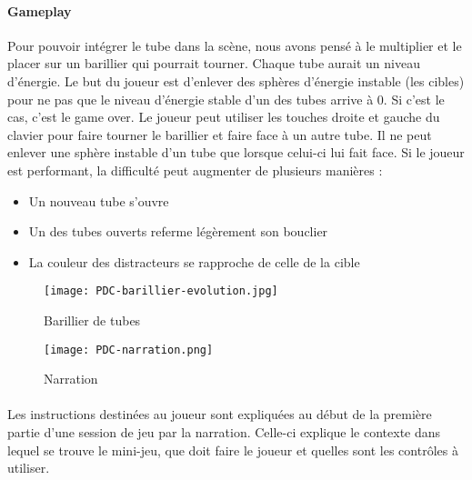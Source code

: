 \newpage

\paragraph{Gameplay}Pour pouvoir intégrer le tube dans la scène, nous avons pensé à le multiplier et le placer sur un barillier qui pourrait tourner. Chaque tube aurait un niveau
d'énergie. Le but du joueur est d'enlever des sphères d'énergie instable (les cibles) pour ne pas que le niveau d'énergie stable d'un des tubes arrive à 0. Si c'est le cas, c'est le
game over. Le joueur peut utiliser les touches droite et gauche du clavier pour faire tourner le barillier et faire face à un autre tube. Il ne peut enlever une sphère instable d'un
tube que lorsque celui-ci lui fait face. Si le joueur est performant, la difficulté peut augmenter de plusieurs manières :
\begin{itemize}
    \item Un nouveau tube s'ouvre
    \item Un des tubes ouverts referme légèrement son bouclier
    \item La couleur des distracteurs se rapproche de celle de la cible
\end{itemize}

\begin{figure}[H]
    \begin{center}
    \texttt{[image: PDC-barillier-evolution.jpg]}
    \end{center}
    \caption{Barillier de tubes}
\label{BarillierTube}
\end{figure}

\begin{wrapfigure}[6]{l}{5cm}
    \vspace{-25pt}
    \texttt{[image: PDC-narration.png]}
    \captionsetup{labelformat=simpleNumber}
    \caption{Narration}
\end{wrapfigure}

\paragraph{}Les instructions destinées au joueur sont expliquées au début de la première partie d'une session de jeu par la narration. Celle-ci explique le contexte dans lequel se
trouve le mini-jeu, que doit faire le joueur et quelles sont les contrôles à utiliser. \\ \\ \\


